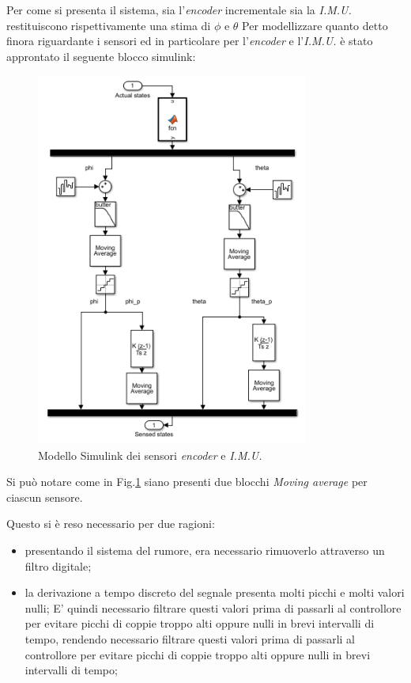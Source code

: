 Per come si presenta il sistema, sia l'\textit{encoder} incrementale sia la \textit{I.M.U.} restituiscono rispettivamente una stima di $\phi$ e $\theta$
Per modellizzare quanto detto finora riguardante i sensori ed in particolare per l'\textit{encoder} e l'\textit{I.M.U.} è stato approntato il seguente blocco simulink:
\begin{figure}[H]
	\centering   	
	\includegraphics[width=0.8\textwidth]{Immagini/sensor_block1.png}
	\caption{Modello Simulink dei sensori \textit{encoder} e \textit{I.M.U.}}
	\label{fig:sensor_block1}
\end{figure}
Si può notare come in Fig.\ref{fig:sensor_block1} siano presenti due blocchi \textit{Moving average} per ciascun sensore.

Questo si è reso necessario per due ragioni:
\begin{itemize}
	\item  presentando il sistema del rumore, era necessario rimuoverlo attraverso un filtro digitale;
	\item la derivazione a tempo discreto del segnale presenta molti picchi e molti valori nulli;
	E' quindi necessario filtrare questi valori prima di passarli al controllore per evitare picchi di coppie troppo alti oppure nulli in brevi intervalli di tempo, rendendo necessario filtrare questi valori prima di passarli al controllore per evitare picchi di coppie troppo alti oppure nulli in brevi intervalli di tempo;
\end{itemize}

